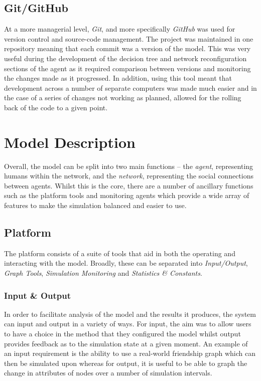 \documentclass[]{report}
\begin{document}
\subsection{Git/GitHub}
At a more managerial level, \emph{Git}, and more specifically \emph{GitHub} was used for version control and source-code management. The project was maintained in one repository meaning that each commit was a version of the model. This was very useful during the development of the decision tree and network reconfiguration sections of the agent as it required comparison between versions and monitoring the changes made as it progressed. In addition, using this tool meant that development across a number of separate computers was made much easier and in the case of a series of changes not working as planned, allowed for the rolling back of the code to a given point.

\section{Model Description}
Overall, the model can be split into two main functions – the \emph{agent}, representing humans within the network, and the \emph{network}, representing the social connections between agents. Whilst this is the core, there are a number of ancillary functions such as the platform tools and monitoring agents which provide a wide array of features to make the simulation balanced and easier to use.

\subsection{Platform}
\label{sec:platform}
The platform consists of a suite of tools that aid in both the operating and interacting with the model. Broadly, these can be separated into \emph{Input/Output}, \emph{Graph Tools}, \emph{Simulation Monitoring} and \emph{Statistics \& Constants}.

\subsubsection{Input \& Output}
In order to facilitate analysis of the model and the results it produces, the system can input and output in a variety of ways. For input, the aim was to allow users to have a choice in the method that they configured the model whilst output provides feedback as to the simulation state at a given moment. An example of an input requirement is the ability to use a real-world friendship graph which can then be simulated upon whereas for output, it is useful to be able to graph the change in attributes of nodes over a number of simulation intervals.
\end{document}
